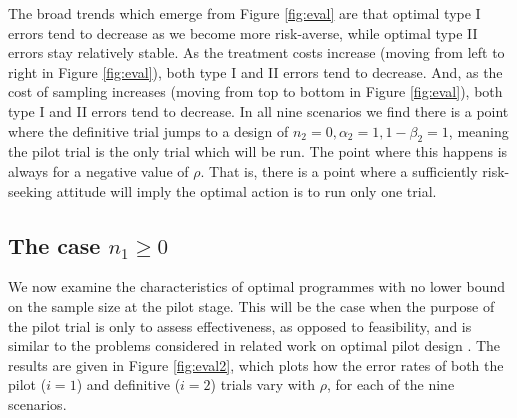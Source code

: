 \documentclass[sagev, Crown]{sagej} %
\begin{document}
The broad trends which emerge from Figure \ref{fig:eval} are that optimal type I errors tend to decrease as we become more risk-averse, while optimal type II errors stay relatively stable. As the treatment costs increase (moving from left to right in Figure \ref{fig:eval}), both type I and II errors tend to decrease. And, as the cost of sampling increases (moving from top to bottom in Figure \ref{fig:eval}), both type I and II errors tend to decrease. In all nine scenarios we find there is a point where the definitive trial jumps to a design of $n_2 = 0, \alpha_2 = 1, 1-\beta_2 = 1$, meaning the pilot trial is the only trial which will be run. The point where this happens is always for a negative value of $\rho$. That is, there is a point where a sufficiently risk-seeking attitude will imply the optimal action is to run only one trial.

\subsection{The case $n_1 \geq 0$}

We now examine the characteristics of optimal programmes with no lower bound on the sample size at the pilot stage. This will be the case when the purpose of the pilot trial is only to assess effectiveness, as opposed to feasibility, and is similar to the problems considered in related work on optimal pilot design \cite{Stallard2012}. The results are given in Figure \ref{fig:eval2}, which plots how the error rates of both the pilot ($i = 1$) and definitive ($i = 2$) trials vary with $\rho$, for each of the nine scenarios.
\end{document}

